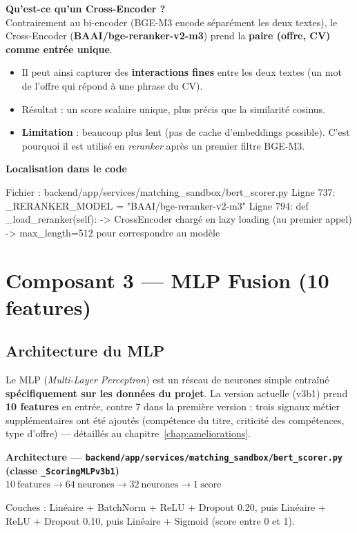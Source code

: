 \documentclass[12pt,a4paper]{report}
\newenvironment{infobox}[1][]{%
  \begin{framed}\noindent\textbf{\textcolor{navyblue}{#1}}\\[2pt]%
}{\end{framed}}
\newenvironment{codebox}[1][]{%
  \begin{framed}\noindent\textbf{\small\textcolor{codeblue}{#1}}\\[2pt]\ttfamily\small%
}{\end{framed}}
\newcommand{\filepath}[1]{\texttt{\small\textcolor{codeblue}{#1}}}
\begin{document}
\begin{infobox}[Qu'est-ce qu'un Cross-Encoder ?]
Contrairement au bi-encoder (BGE-M3 encode séparément les deux textes),
le Cross-Encoder (\textbf{BAAI/bge-reranker-v2-m3}) prend la \textbf{paire
(offre, CV) comme entrée unique}.
\begin{itemize}
  \item Il peut ainsi capturer des \textbf{interactions fines} entre les deux textes
        (un mot de l'offre qui répond à une phrase du CV).
  \item Résultat : un score scalaire unique, plus précis que la similarité cosinus.
  \item \textbf{Limitation} : beaucoup plus lent (pas de cache d'embeddings possible).
        C'est pourquoi il est utilisé en \textit{reranker} après un premier filtre BGE-M3.
\end{itemize}
\end{infobox}

\begin{codebox}[Localisation dans le code]
Fichier  : backend/app/services/matching_sandbox/bert_scorer.py
Ligne 737: _RERANKER_MODEL = "BAAI/bge-reranker-v2-m3"
Ligne 794: def _load_reranker(self):
           -> CrossEncoder chargé en lazy loading (au premier appel)
           -> max_length=512 pour correspondre au modèle
\end{codebox}

\section{Composant 3 — MLP Fusion (10 features)}

\subsection{Architecture du MLP}

Le MLP (\textit{Multi-Layer Perceptron}) est un réseau de neurones simple entraîné
\textbf{spécifiquement sur les données du projet}. La version actuelle (v3b1) prend
\textbf{10 features} en entrée, contre 7 dans la première version : trois signaux
métier supplémentaires ont été ajoutés (compétence du titre, criticité des
compétences, type d'offre) — détaillés au chapitre~\ref{chap:ameliorations}.

\begin{infobox}[Architecture — \filepath{backend/app/services/matching\_sandbox/bert\_scorer.py} (classe \texttt{\_ScoringMLPv3b1})]
$10\ \text{features} \rightarrow 64\ \text{neurones} \rightarrow 32\ \text{neurones} \rightarrow 1\ \text{score}$

Couches : Linéaire + BatchNorm + ReLU + Dropout 0.20, puis Linéaire + ReLU +
Dropout 0.10, puis Linéaire + Sigmoid (score entre 0 et 1).
\end{infobox}
\end{document}
